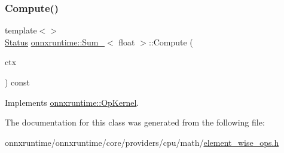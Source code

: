 \subsubsection{\texorpdfstring{Compute()}{Compute()}\hspace{0.1cm}{\footnotesize\ttfamily [2/2]}}
{\footnotesize\ttfamily template$<$$>$ \\
\mbox{\hyperlink{classonnxruntime_1_1common_1_1Status}{Status}} \mbox{\hyperlink{classonnxruntime_1_1Sum__6}{onnxruntime\+::\+Sum\+\_}}$<$ float $>$\+::Compute (\begin{DoxyParamCaption}\item[{\mbox{\hyperlink{classonnxruntime_1_1OpKernelContext}{Op\+Kernel\+Context}} $\ast$}]{ctx }\end{DoxyParamCaption}) const\hspace{0.3cm}{\ttfamily [virtual]}}



Implements \mbox{\hyperlink{classonnxruntime_1_1OpKernel_a9eca8656a78b1b3ab9d3351a12798650}{onnxruntime\+::\+Op\+Kernel}}.



The documentation for this class was generated from the following file\+:\begin{DoxyCompactItemize}
\item 
onnxruntime/onnxruntime/core/providers/cpu/math/\mbox{\hyperlink{element__wise__ops_8h}{element\+\_\+wise\+\_\+ops.\+h}}\end{DoxyCompactItemize}
